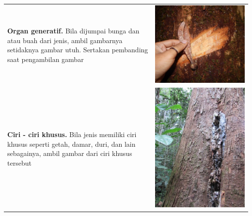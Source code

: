 \documentclass[
  oneside]{book}
\begin{document}
\begin{longtable}[]{@{}
  >{\raggedright\arraybackslash}p{}
  >{\raggedright\arraybackslash}p{}@{}}
\textbf{Organ generatif.} Bila dijumpai bunga dan atau buah dari jenis, ambil gambarnya setidaknya gambar utuh. Sertakan pembanding saat pengambilan gambar & \includegraphics{images/gkj4.jpg} \\
\textbf{Ciri - ciri khusus.} Bila jenis memiliki ciri khusus seperti getah, damar, duri, dan lain sebagainya, ambil gambar dari ciri khusus tersebut & \includegraphics{images/gkj5.jpg} \\
\bottomrule()
\end{longtable}
\end{document}
